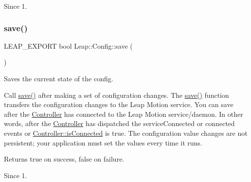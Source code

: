 \begin{DoxyCodeInclude}
\end{DoxyCodeInclude}


\begin{DoxySince}{Since}
1. 
\end{DoxySince}
\mbox{\label{class_leap_1_1_config_ae1187e2b9992706d2a3eb071cc2f71c4}} 
\subsubsection{\texorpdfstring{save()}{save()}}
{\footnotesize\ttfamily L\+E\+A\+P\+\_\+\+E\+X\+P\+O\+RT bool Leap\+::\+Config\+::save (\begin{DoxyParamCaption}{ }\end{DoxyParamCaption})}

Saves the current state of the config.

Call {\ttfamily \hyperlink{class_leap_1_1_config_ae1187e2b9992706d2a3eb071cc2f71c4}{save()}} after making a set of configuration changes. The {\ttfamily \hyperlink{class_leap_1_1_config_ae1187e2b9992706d2a3eb071cc2f71c4}{save()}} function transfers the configuration changes to the Leap Motion service. You can save after the \hyperlink{class_leap_1_1_controller}{Controller} has connected to the Leap Motion service/daemon. In other words, after the \hyperlink{class_leap_1_1_controller}{Controller} has dispatched the service\+Connected or connected events or \hyperlink{class_leap_1_1_controller_a38835f744f2c56ae8914378b75085f14}{Controller\+::is\+Connected} is true. The configuration value changes are not persistent; your application must set the values every time it runs.


\begin{DoxyCodeInclude}
\end{DoxyCodeInclude}


\begin{DoxyReturn}{Returns}
true on success, false on failure. 
\end{DoxyReturn}
\begin{DoxySince}{Since}
1. 
\end{DoxySince}
\mbox{\label{class_leap_1_1_config_a98b3f1b4a5b306aa8c404bdd49276554}} 
